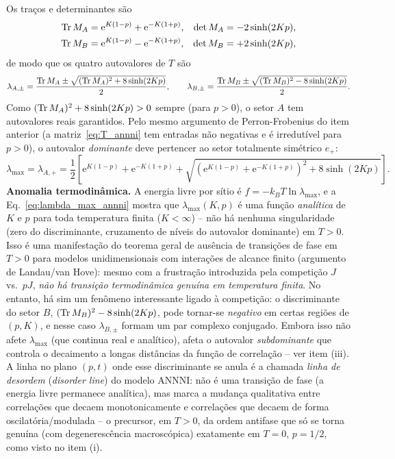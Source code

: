\documentclass[11pt,a4paper]{article}
\newcommand{\e}[1]{\mathrm{e}^{#1}}
\begin{document}
%
Os traços e determinantes são
%
\begin{align}
    \Tr M_A&=\e{K(1-p)}+\e{-K(1+p)}, & \det M_A&=-2\sinh(2Kp),\\
    \Tr M_B&=\e{K(1-p)}-\e{-K(1+p)}, & \det M_B&=+2\sinh(2Kp),
\end{align}
%
de modo que os quatro autovalores de $T$ são
%
\begin{equation}
    \lambda_{A,\pm}=\frac{\Tr M_A\pm\sqrt{(\Tr M_A)^2+8\sinh(2Kp)}}{2},
    \qquad
    \lambda_{B,\pm}=\frac{\Tr M_B\pm\sqrt{(\Tr M_B)^2-8\sinh(2Kp)}}{2}.
\end{equation}
%
Como $(\Tr M_A)^2+8\sinh(2Kp)>0$ sempre (para $p>0$), o setor $A$ tem autovalores reais garantidos. Pelo mesmo argumento de Perron-Frobenius do item anterior (a matriz~\eqref{eq:T_annni} tem entradas não negativas e é irredutível para $p>0$), o autovalor \emph{dominante} deve pertencer ao setor totalmente simétrico $e_+$:
%
\begin{equation}
    \boxed{
    \lambda_{\max}=\lambda_{A,+}
    =\frac12\left[\e{K(1-p)}+\e{-K(1+p)}+\sqrt{\left(\e{K(1-p)}+\e{-K(1+p)}\right)^2+8\sinh(2Kp)}\right].
    }
    \label{eq:lambda_max_annni}
\end{equation}
%
\noindent\textbf{Anomalia termodinâmica.} A energia livre por sítio é $f=-k_BT\ln\lambda_{\max}$, e a Eq.~\eqref{eq:lambda_max_annni} mostra que $\lambda_{\max}(K,p)$ é uma função \emph{analítica} de $K$ e $p$ para toda temperatura finita ($K<\infty$) -- não há nenhuma singularidade (zero do discriminante, cruzamento de níveis do autovalor dominante) em $T>0$. Isso é uma manifestação do teorema geral de ausência de transições de fase em $T>0$ para modelos unidimensionais com interações de alcance finito (argumento de Landau/van Hove): mesmo com a frustração introduzida pela competição $J$ vs.\ $pJ$, \emph{não há transição termodinâmica genuína em temperatura finita}.
%
No entanto, há sim um fenômeno interessante ligado à competição: o discriminante do setor $B$, $(\Tr M_B)^2-8\sinh(2Kp)$, pode tornar-se \emph{negativo} em certas regiões de $(p,K)$, e nesse caso $\lambda_{B,\pm}$ formam um par complexo conjugado. Embora isso não afete $\lambda_{\max}$ (que continua real e analítico), afeta o autovalor \emph{subdominante} que controla o decaimento a longas distâncias da função de correlação -- ver item (iii). A linha no plano $(p,t)$ onde esse discriminante se anula é a chamada \emph{linha de desordem} (\textit{disorder line}) do modelo ANNNI: não é uma transição de fase (a energia livre permanece analítica), mas marca a mudança qualitativa entre correlações que decaem monotonicamente e correlações que decaem de forma oscilatória/modulada -- o precursor, em $T>0$, da ordem antifase que só se torna genuína (com degenerescência macroscópica) exatamente em $T=0$, $p=1/2$, como visto no item (i).
%
\end{document}

